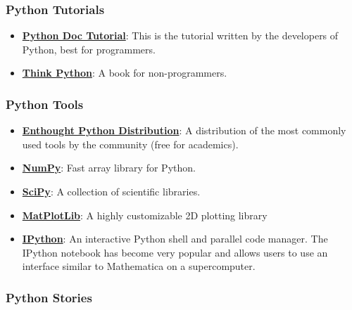 \documentclass{article}
\begin{document}
\subsubsection{Python Tutorials}\label{python-tutorials}

\begin{itemize}
\itemsep1pt\parskip0pt
\item
  \textbf{\href{http://docs.python.org/tutorial/}{Python Doc Tutorial}}:
  This is the tutorial written by the developers of Python, best for
  programmers.
\item
  \textbf{\href{http://www.greenteapress.com/thinkpython/}{Think
  Python}}: A book for non-programmers.
\end{itemize}

\subsubsection{Python Tools}\label{python-tools}

\begin{itemize}
\itemsep1pt\parskip0pt
\item
  \textbf{\href{http://www.enthought.com/products/epd.php}{Enthought
  Python Distribution}}: A distribution of the most commonly used tools
  by the community (free for academics).
\item
  \textbf{\href{http://numpy.scipy.org/}{NumPy}}: Fast array library for
  Python.
\item
  \textbf{\href{http://scipy.org}{SciPy}}: A collection of scientific
  libraries.
\item
  \textbf{\href{http://matplotlib.sourceforge.net/}{MatPlotLib}}: A
  highly customizable 2D plotting library
\item
  \textbf{\href{http://ipython.org/}{IPython}}: An interactive Python
  shell and parallel code manager. The IPython notebook has become very
  popular and allows users to use an interface similar to Mathematica on
  a supercomputer.
\end{itemize}

\subsubsection{Python Stories}\label{python-stories}
\end{document}
